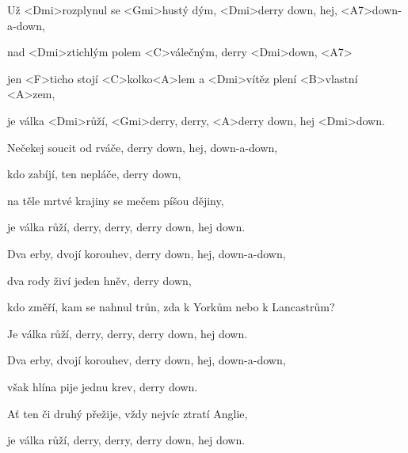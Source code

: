 
\zs
Už <Dmi>rozplynul se <Gmi>hustý dým, <Dmi>derry down, hej, <A7>down-a-down, 

nad <Dmi>ztichlým polem <C>válečným, derry <Dmi>down, <A7> 

jen <F>ticho stojí <C>kolko<A>lem a <Dmi>vítěz plení <B>vlastní <A>zem, 

je válka <Dmi>růží, <Gmi>derry, derry, <A>derry down, hej <Dmi>down. \ks

\zs
Nečekej soucit od rváče, derry down, hej, down-a-down, 

kdo zabíjí, ten nepláče, derry down, 

na těle mrtvé krajiny se mečem píšou dějiny, 

je válka růží, derry, derry, derry down, hej down.
\ks

\zs
Dva erby, dvojí korouhev, derry down, hej, down-a-down, 

dva rody živí jeden hněv, derry down, 

kdo změří, kam se nahnul trůn, zda k Yorkům nebo k Lancastrům?

Je válka růží, derry, derry, derry down, hej down.
\ks

\zs
Dva erby, dvojí korouhev, derry down, hej, down-a-down, 

však hlína pije jednu krev, derry down.

Ať ten či druhý přežije, vždy nejvíc ztratí Anglie, 

je válka růží, derry, derry, derry down, hej down.
\ks
\kp
